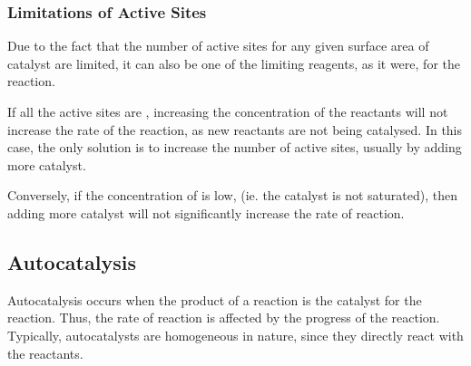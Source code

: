 			\subsubsection{Limitations of Active Sites}

				Due to the fact that the number of active sites for any given surface area of catalyst are limited, it can also be one of
				the limiting reagents, as it were, for the reaction.

				If all the active sites are , increasing the concentration of the reactants will not increase the rate of
				the reaction, as new reactants are not being catalysed. In this case, the only solution is to increase the number of active
				sites, usually by adding more catalyst.

				Conversely, if the concentration of  is low, (ie. the catalyst is not saturated), then adding more catalyst
				will not significantly increase the rate of reaction.



		\subsection{Autocatalysis}

			Autocatalysis occurs when the product of a reaction is the catalyst for the reaction. Thus, the rate of reaction is affected
			by the progress of the reaction. Typically, autocatalysts are homogeneous in nature, since they directly react with the reactants.

			\begin{center}
			\end{center}

